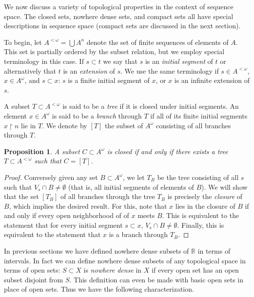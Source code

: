 \documentclass[11pt,oneside,a4paper]{amsbook}
\newcommand{\R}{\mathbb R}
\theoremstyle{definition}
\theoremstyle{plain}
\newtheorem{proposition}[theorem]{Proposition}
\theoremstyle{definition}
\theoremstyle{remark}
\numberwithin{equation}{section}
\numberwithin{figure}{section}
\begin{document}
We now discuss a variety of topological properties in the context of sequence space. The closed sets, nowhere dense sets, and compact sets all have special descriptions in sequence space (compact sets are discussed in the next section).

To begin, let $A^{<\omega}=\bigcup A^n$ denote the set of finite sequences of elements of $A$. This set is partially ordered by the subset relation, but we employ special terminology in this case. If $s\subset t$ we say that $s$ is an \emph{initial segment} of $t$ or alternatively that $t$ is an \emph{extension} of $s$. We use the same terminology if $s\in A^{<\omega}$, $x\in A^\omega$, and $s\subset x$: $s$ is a finite initial segment of $x$, or $x$ is an infinite extension of $s$.

A subset $T\subset A^{<\omega}$ is said to be a \emph{tree} if it is closed under initial segments. An element $x\in A^\omega$ is said to be a \emph{branch} through $T$ if all of its finite initial segments $x\restriction n$ lie in $T$. We denote by $[T]$ the subset of $A^\omega$ consisting of all branches through $T$.

\begin{proposition}
  A subset $C\subset A^\omega$ is closed if and only if there exists a tree $T\subset A^{<\omega}$ such that $C=[T]$.
\end{proposition}

\begin{proof}
  Conversely given any set $B\subset A^\omega$, we let $T_B$ be the tree consisting of all $s$ such that $V_s\cap B\neq\emptyset$ (that is, all initial segments of elements of $B$). We will show that the set $[T_B]$ of all branches through the tree $T_B$ is precisely the \emph{closure} of $B$, which implies the desired result. For this, note that $x$ lies in the closure of $B$ if and only if every open neighborhood of of $x$ meets $B$. This is equivalent to the statement that for every initial segment $s\subset x$, $V_s\cap B\neq\emptyset$. Finally, this is equivalent to the statement that $x$ is a branch through $T_B$.
\end{proof}


In previous sections we have defined nowhere dense subsets of $\R$ in terms of intervals. In fact we can define nowhere dense subsets of any topological space in terms of open sets: $S\subset X$ is \emph{nowhere dense} in $X$ if every open set has an open subset disjoint from $S$. This definition can even be made with basic open sets in place of open sets. Thus we have the following characterization.
\end{document}
